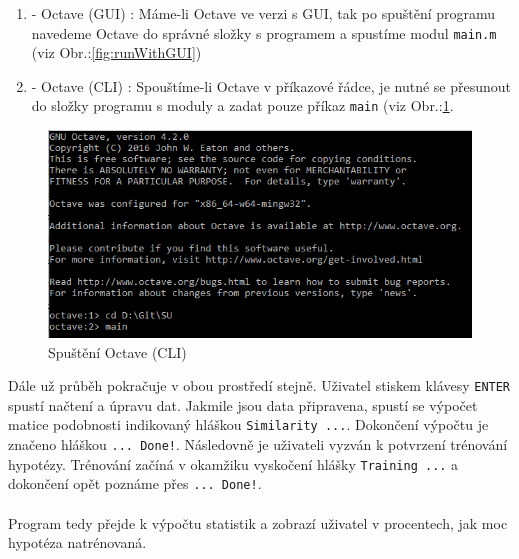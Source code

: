 \documentclass[a4]{article}
\begin{document}
\begin{enumerate}
	\item - Octave (GUI) : Máme-li Octave ve verzi s GUI, tak po spuštění programu navedeme Octave do správné složky s programem a spustíme modul \texttt{main.m} (viz Obr.:\ref{fig:runWithGUI})
	\item - Octave (CLI) : Spouštíme-li Octave v příkazové řádce, je nutné se přesunout do složky programu s moduly a zadat pouze příkaz \texttt{main} (viz Obr.:\ref{fig:runWithoutGUI}.
\end{enumerate}

\begin{figure}[!ht]
	\centering
		\includegraphics[width=\textwidth]{images/runWithoutGUI}
	\caption{Spuštění Octave (CLI)}
	\label{fig:runWithoutGUI}
\end{figure}

\noindent Dále už průběh pokračuje v obou prostředí stejně. Uživatel stiskem klávesy \texttt{ENTER} spustí načtení a úpravu dat. Jakmile jsou data připravena, spustí se výpočet matice podobnosti indikovaný hláškou \texttt{Similarity ...}. Dokončení výpočtu je značeno hláškou \texttt{... Done!}. Následovně je uživateli vyzván k potvrzení trénování hypotézy. Trénování začíná v okamžiku vyskočení hlášky \texttt{Training ...} a dokončení opět poznáme přes \texttt{... Done!}.
\\\\
Program tedy přejde k výpočtu statistik a zobrazí uživatel v procentech, jak moc hypotéza natrénovaná.
\end{document}

